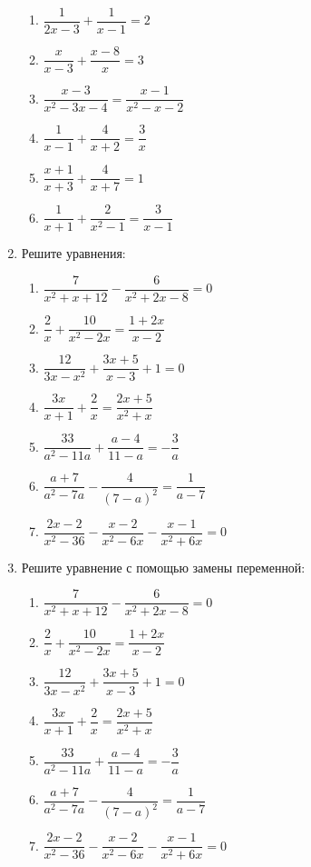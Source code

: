 \documentclass[12pt, a4paper]{article}
\begin{document}
\begin{enumerate}
	\begin{multicols}{2}
		\begin{enumerate}[label=\asbuk*)]
			\item $\dfrac{1}{2x-3}+\dfrac{1}{x-1}=2$
			\item $\dfrac{x}{x-3}+\dfrac{x-8}{x}=3$
			\item $\dfrac{x-3}{x^2-3x-4}=\dfrac{x-1}{x^2-x-2}$
			\item $\dfrac{1}{x-1}+\dfrac{4}{x+2}=\dfrac{3}{x}$
			\item $\dfrac{x+1}{x+3}+\dfrac{4}{x+7}=1$
			\item $\dfrac{1}{x+1}+\dfrac{2}{x^2-1}=\dfrac{3}{x-1}$
		\end{enumerate}
	\end{multicols}
	\item Решите уравнения:
	\begin{multicols}{2}
		\begin{enumerate}[label=\asbuk*)]
			\item $\dfrac{7}{x^2+x+12}-\dfrac{6}{x^2+2x-8}=0$
			\item $\dfrac{2}{x}+\dfrac{10}{x^2-2x}=\dfrac{1+2x}{x-2}$
			\item $\dfrac{12}{3x-x^2}+\dfrac{3x+5}{x-3}+1=0$
			\item $\dfrac{3x}{x+1}+\dfrac{2}{x}=\dfrac{2x+5}{x^2+x}$
			\item $\dfrac{33}{a^2-11a}+\dfrac{a-4}{11-a}=-\dfrac{3}{a}$
			\item $\dfrac{a+7}{a^2-7a}-\dfrac{4}{(7-a)^2}=\dfrac{1}{a-7}$
			\item $\dfrac{2x-2}{x^2-36}-\dfrac{x-2}{x^2-6x}-\dfrac{x-1}{x^2+6x}=0$
		\end{enumerate}
	\end{multicols}
	\item Решите уравнение с помощью замены переменной:
	\begin{multicols}{2}
		\begin{enumerate}[label=\asbuk*)]
			\item $\dfrac{7}{x^2+x+12}-\dfrac{6}{x^2+2x-8}=0$
			\item $\dfrac{2}{x}+\dfrac{10}{x^2-2x}=\dfrac{1+2x}{x-2}$
			\item $\dfrac{12}{3x-x^2}+\dfrac{3x+5}{x-3}+1=0$
			\item $\dfrac{3x}{x+1}+\dfrac{2}{x}=\dfrac{2x+5}{x^2+x}$
			\item $\dfrac{33}{a^2-11a}+\dfrac{a-4}{11-a}=-\dfrac{3}{a}$
			\item $\dfrac{a+7}{a^2-7a}-\dfrac{4}{(7-a)^2}=\dfrac{1}{a-7}$
			\item $\dfrac{2x-2}{x^2-36}-\dfrac{x-2}{x^2-6x}-\dfrac{x-1}{x^2+6x}=0$
		\end{enumerate}
	\end{multicols}
\end{enumerate}
\end{document}

